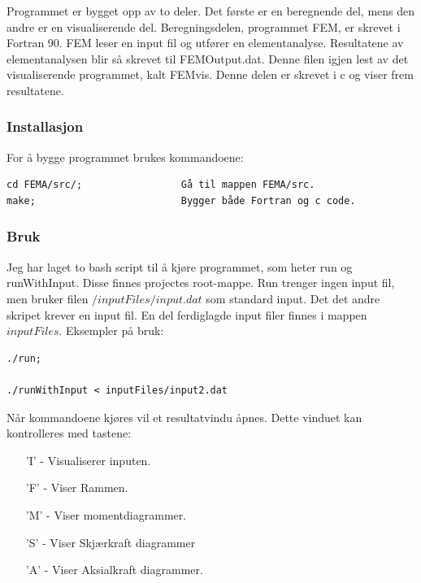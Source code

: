 \documentclass[10pt,a4paper, norsk]{article}
\begin{document}
Programmet er bygget opp av to deler. Det første er en beregnende del, mens den andre er en visualiserende del. Beregningsdelen, programmet FEM, er skrevet i  Fortran 90. FEM leser en input fil og utfører en elementanalyse. Resultatene av elementanalysen blir så skrevet til FEMOutput.dat. Denne filen igjen lest av det visualiserende programmet, kalt FEMvis. Denne delen er skrevet i c og viser frem resultatene.





\subsubsection{Installasjon}
For å bygge programmet brukes kommandoene:

\begin{verbatim}
cd FEMA/src/;                 Gå til mappen FEMA/src.
make;                         Bygger både Fortran og c code.
\end{verbatim}

\subsubsection{Bruk} 
Jeg har laget to bash script til å kjøre programmet, som heter run og runWithInput. Disse finnes projectes root-mappe.  Run trenger ingen input fil, men bruker filen $/inputFiles/input.dat$ som standard input. Det det andre skripet krever en input fil. En del ferdiglagde input filer finnes i mappen $inputFiles$.
Eksempler på bruk:

\begin{verbatim}
./run;

./runWithInput < inputFiles/input2.dat
\end{verbatim}

Når kommandoene kjøres vil et resultatvindu åpnes. Dette vinduet kan kontrolleres med tastene: 

\begin{itemize}
\setlength{\itemsep}{0cm}%
\setlength{\parskip}{0cm}%
\item['I'] - Visualiserer inputen.
\item['F'] - Viser Rammen.
\item['M'] - Viser momentdiagrammer.
\item['S'] - Viser Skjærkraft diagrammer
\item['A'] - Viser Aksialkraft diagrammer.
\end{itemize}
\end{document}
